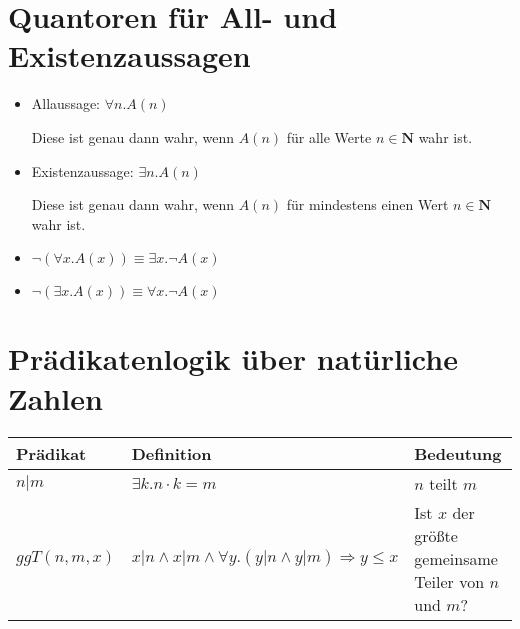 \documentclass{article}
\begin{document}
\large
\section*{Quantoren für All- und Existenzaussagen}

\begin{itemize}[label=]
	\item {\Large Allaussage:}
	      $\forall n. A(n)$

	      Diese ist genau dann wahr, wenn $A(n)$ für
	      alle Werte $n \in \mathbf{N}$ wahr ist. \\

	\item {\Large Existenzaussage:}
	      $\exists n. A(n)$

	      Diese ist genau dann wahr, wenn $A(n)$ für
	      mindestens einen Wert $n \in \mathbf{N}$ wahr ist.
\end{itemize}
\begin{lemmaBox}[2.2]
	\begin{itemize}[label=]
		\item $\neg (\forall x. A(x)) \equiv \exists x. \neg A(x)$
		\item $\neg (\exists x. A(x)) \equiv \forall x. \neg A(x)$
	\end{itemize}
\end{lemmaBox}


\section*{Prädikatenlogik über natürliche Zahlen}
\begin{center}
	\begin{tabular}{C{3cm}|C{4cm}|L{6cm}}
		Prädikat     & Definition                                                            & Bedeutung                                             \\
		[10pt]\midrule
		$n|m$        & $\exists k. n \cdot k = m$                                            & $n$ teilt $m$                                         \\
		[10pt]
		$ggT(n,m,x)$ & $x|n \land x|m \land \forall y. (y|n \land y|m) \Rightarrow y \leq x$ & Ist $x$ der größte gemeinsame Teiler von $n$ und $m$? \\
	\end{tabular}
\end{center}
\end{document}
